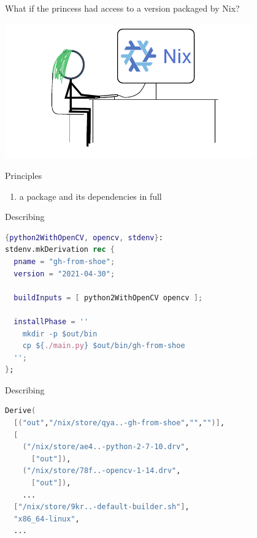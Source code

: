 \documentclass[aspectratio=169]{beamer}
\newcommand{\couleur}[2]{{\color{#1}{#2}}}
\begin{document}
\begin{frame}
What if the princess had access to a version packaged by Nix?
\begin{center}
    \includegraphics[width=0.8\textwidth]{img/princess-comics-computer-nix.pdf}
\end{center}
\end{frame}

\begin{frame}
    \begin{block}{Principles}
        \begin{enumerate}
            \item<2-> \couleur{blue-portage}{Describe} a package and its
                dependencies in full
         \end{enumerate}
    \end{block}
\end{frame}

\begin{frame}[fragile]{Describing}
\begin{lstlisting}[language=Nix,title={gh-from-shoe/default.nix}]
{python2WithOpenCV, opencv, stdenv}:
stdenv.mkDerivation rec {
  pname = "gh-from-shoe";
  version = "2021-04-30";

  buildInputs = [ python2WithOpenCV opencv ];

  installPhase = ''
    mkdir -p $out/bin
    cp ${./main.py} $out/bin/gh-from-shoe
  '';
};
\end{lstlisting}
\end{frame}

\begin{frame}[fragile]{Describing}
\begin{lstlisting}[language=Nix,title={gh-from-shoe-1-0.drv (generated)}]
Derive(
  [("out","/nix/store/qya..-gh-from-shoe","","")],
  [
    ("/nix/store/ae4..-python-2-7-10.drv",
      ["out"]),
    ("/nix/store/78f..-opencv-1-14.drv",
      ["out"]),
    ...
  ["/nix/store/9kr..-default-builder.sh"],
  "x86_64-linux",
  ...
\end{lstlisting}
\end{frame}
\end{document}
